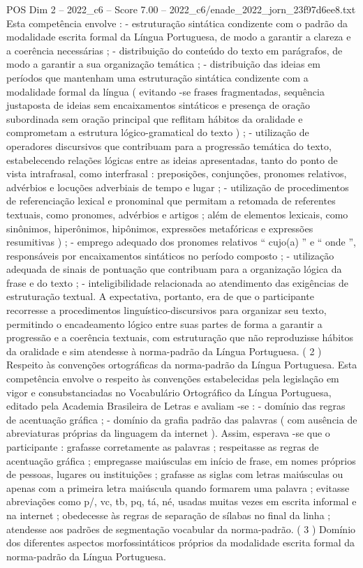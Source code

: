 \begin{textsample}{POS Dim 2 – 2022\_c6 – Score 7.00 – 2022\_c6/enade\_2022\_jorn\_23f97d6ee8.txt}
Esta competência envolve : - estruturação sintática condizente com o padrão da modalidade escrita formal da Língua Portuguesa, de modo a garantir a clareza e a coerência necessárias ; - distribuição do conteúdo do texto em parágrafos, de modo a garantir a sua organização temática ; - distribuição das ideias em períodos que mantenham uma estruturação sintática condizente com a modalidade formal da língua ( evitando -se frases fragmentadas, sequência justaposta de ideias sem encaixamentos sintáticos e presença de oração subordinada sem oração principal que reflitam hábitos da oralidade e comprometam a estrutura lógico-gramatical do texto ) ; - utilização de operadores discursivos que contribuam para a progressão temática do texto, estabelecendo relações lógicas entre as ideias apresentadas, tanto do ponto de vista intrafrasal, como interfrasal : preposições, conjunções, pronomes relativos, advérbios e locuções adverbiais de tempo e lugar ; - utilização de procedimentos de referenciação lexical e pronominal que permitam a retomada de referentes textuais, como pronomes, advérbios e artigos ; além de elementos lexicais, como sinônimos, hiperônimos, hipônimos, expressões metafóricas e expressões resumitivas ) ; - emprego adequado dos pronomes relativos “ cujo(a) ” e “ onde ”, responsáveis por encaixamentos sintáticos no período composto ; - utilização adequada de sinais de pontuação que contribuam para a organização lógica da frase e do texto ; - inteligibilidade relacionada ao atendimento das exigências de estruturação textual.
A expectativa, portanto, era de que o participante recorresse a procedimentos linguístico-discursivos para organizar seu texto, permitindo o encadeamento lógico entre suas partes de forma a garantir a progressão e a coerência textuais, com estruturação que não reproduzisse hábitos da oralidade e sim atendesse à norma-padrão da Língua Portuguesa. ( 2 ) Respeito às convenções ortográficas da norma-padrão da Língua Portuguesa.
Esta competência envolve o respeito às convenções estabelecidas pela legislação em vigor e consubstanciadas no Vocabulário Ortográfico da Língua Portuguesa, editado pela Academia Brasileira de Letras e avaliam -se : - domínio das regras de acentuação gráfica ; - domínio da grafia padrão das palavras ( com ausência de abreviaturas próprias da linguagem da internet ).
Assim, esperava -se que o participante : grafasse corretamente as palavras ; respeitasse as regras de acentuação gráfica ; empregasse maiúsculas em início de frase, em nomes próprios de pessoas, lugares ou instituições ; grafasse as siglas com letras maiúsculas ou apenas com a primeira letra maiúscula quando formarem uma palavra ; evitasse abreviações como p/, vc, tb, pq, tá, né, usadas muitas vezes em escrita informal e na internet ; obedecesse às regras de separação de sílabas no final da linha ; atendesse aos padrões de segmentação vocabular da norma-padrão. ( 3 ) Domínio dos diferentes aspectos morfossintáticos próprios da modalidade escrita formal da norma-padrão da Língua Portuguesa.

\end{textsample}
